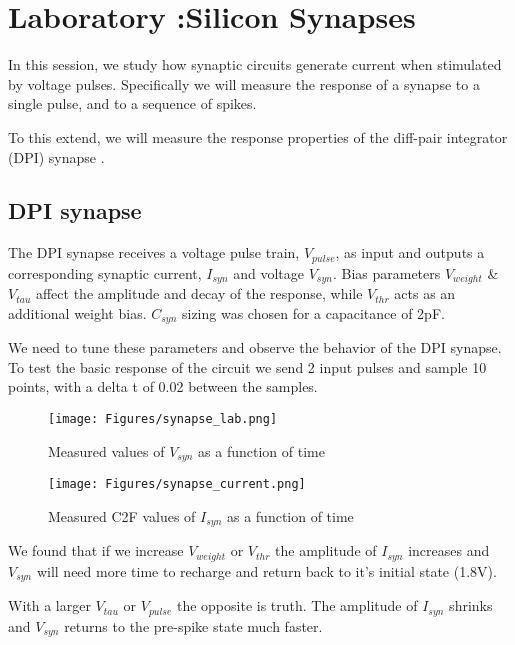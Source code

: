 \section{Laboratory :Silicon Synapses }

In this session, we study how synaptic circuits generate current when stimulated by voltage pulses. Specifically we will measure the response of a synapse to a single pulse, and to a sequence of spikes.

To this extend, we will measure the response properties of the diff-pair integrator (DPI) synapse . 

\subsection{DPI synapse}

The DPI synapse receives a voltage pulse train, $V_{pulse}$, as input and outputs a corresponding synaptic current, $I_{syn}$ and voltage $V_{syn}$. 
Bias parameters $V_{weight}$ \& $V_{tau}$ affect the amplitude and decay of the response, while $V_{thr}$ acts as an additional weight bias. $C_{syn}$ sizing was chosen for a capacitance of 2pF. 


We need to tune these parameters and observe the behavior of the DPI synapse. 
To test the basic response of the circuit we send 2 input pulses and sample 10 points, with a delta t of 0.02 between the samples. 


\begin{figure}[H]
    \centering
    \texttt{[image: Figures/synapse\_lab.png]}
    \caption{Measured values of $V_{syn}$ as a function of time}
    \label{fig:basalandcerebellum}
\end{figure}

\begin{figure}[H]
    \centering
    \texttt{[image: Figures/synapse\_current.png]}
    \caption{Measured C2F values of $I_{syn}$ as a function of time}
    \label{fig:basalandcerebellum}
\end{figure}


We found that if we increase $V_{weight}$ or $V_{thr}$ the amplitude of $I_{syn}$ increases and $V_{syn}$ will need more time to recharge and return back to it's initial state (1.8V). 

With a larger $V_{tau}$ or $V_{pulse}$ the opposite is truth. The amplitude of $I_{syn}$ shrinks and $V_{syn}$ returns to the pre-spike state much faster. 




